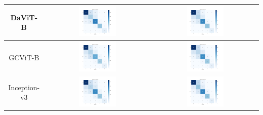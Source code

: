 \begin{table}[!htbp]
\begin{tabular}{|c|c|c|}
        DaViT-B & \includegraphics[width=0.37\textwidth]{figs/confusion_matrices/davit_base-msft_in1k_cm_cross_entropy.png} & \includegraphics[width=0.37\textwidth]{figs/confusion_matrices/davit_base-msft_in1k_cm_corn.png} \\ \hline
        GCViT-B & \includegraphics[width=0.37\textwidth]{figs/confusion_matrices/gcvit_base-in1k_cm_cross_entropy.png} & \includegraphics[width=0.37\textwidth]{figs/confusion_matrices/gcvit_base-in1k_cm_corn.png} \\ \hline
        Inception-v3 & \includegraphics[width=0.37\textwidth]{figs/confusion_matrices/inception_v3_cm_cross_entropy.png} & \includegraphics[width=0.37\textwidth]{figs/confusion_matrices/inception_v3_cm_corn.png} \\ \hline

\end{tabular}
\end{table}
